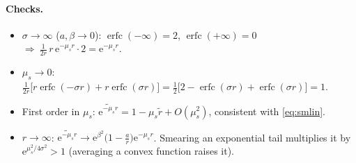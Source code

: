 \documentclass[11pt,a4paper]{article}
\numberwithin{equation}{section}
\theoremstyle{definition}
\theoremstyle{plain}
\theoremstyle{remark}
\numberwithin{algorithm}{section}
\newcommand{\ee}{\mathrm{e}}
\newcommand{\erfc}{\operatorname{erfc}}
\newcommand{\mus}{\mu_s}
\begin{document}
\paragraph{Checks.}
\begin{itemize}[leftmargin=1.3em,itemsep=2pt]
\item $\sigma\to\infty$ ($a,\beta\to0$): $\erfc(-\infty)=2$, $\erfc(+\infty)=0$ $\Rightarrow\ \frac{1}{2r}\,r\,\ee^{-\mus r}\cdot2=\ee^{-\mus r}$.
\item $\mus\to0$: $\frac1{2r}\big[r\erfc(-\sigma r)+r\erfc(\sigma r)\big]=\frac12\big[2-\erfc(\sigma r)+\erfc(\sigma r)\big]=1$.
\item First order in $\mus$: $\widetilde{\ee^{-\mus r}}=1-\mus\tilde r+O(\mus^2)$, consistent with \eqref{eq:smlin}.
\item $r\to\infty$: $\widetilde{\ee^{-\mus r}}\to\ee^{\beta^2}\big(1-\frac ar\big)\ee^{-\mus r}$. Smearing an exponential tail multiplies it by $\ee^{\mus^2/4\sigma^2}>1$ (averaging a convex function raises it).
\end{itemize}
\end{document}
